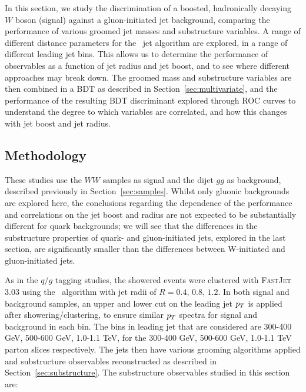 In this section, we study the discrimination of a boosted, hadronically decaying $W$ boson (signal) against a gluon-initiated jet
background, comparing the performance of various groomed jet
masses and substructure variables.
A
range of different distance parameters for the \antikt~jet
algorithm are explored, in a range of different leading jet \pT bins.
This allows us to determine the
performance of observables as a function of jet radius and jet boost, and to see
where different approaches may break down. The groomed
mass and substructure variables are then combined in a BDT as described in Section~\ref{sec:multivariate}, and the performance of the resulting BDT discriminant
explored through ROC curves to understand the degree to which
variables are correlated, and how
this changes with jet boost and jet radius. 

\subsection{Methodology}

These studies use the $WW$ samples as signal and the dijet $gg$ as background, described previously in Section~\ref{sec:samples}. Whilst only gluonic backgrounds
are explored here, the conclusions regarding the dependence of the
performance and correlations on the jet boost and radius are not
expected to be substantially different for quark backgrounds; we will
see that the differences in the substructure properties of quark- and
gluon-initiated jets, explored in the last section, are significantly
smaller than the differences between W-initiated and gluon-initiated jets.

As in the $q/g$ tagging studies, the showered events were clustered with \textsc{FastJet}
3.03 using
the \antikt~algorithm with jet radii of $R = 0.4,\, 0.8,\, 1.2$. In
both signal and background samples, an upper and lower cut on
the leading jet $p_T$ is applied after showering/clustering, to ensure
similar $p_T$ spectra for signal and background in each \pT bin. The bins
in leading jet \pT that are considered are 300-400 GeV, 500-600 GeV,
1.0-1.1 TeV, for the 300-400 GeV, 500-600 GeV,
1.0-1.1 TeV parton \pT slices respectively. The jets then have various
grooming algorithms applied and substructure observables
reconstructed as described in
Section~\ref{sec:substructure}. The substructure observables
studied in this section are: 

